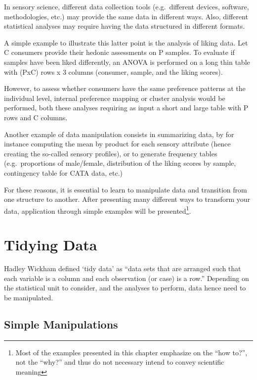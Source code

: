 \documentclass[
]{book}
\begin{document}
In sensory science, different data collection tools (e.g.~different devices, software, methodologies, etc.) may provide the same data in different ways. Also, different statistical analyses may require having the data structured in different formats.

A simple example to illustrate this latter point is the analysis of liking data.
Let C consumers provide their hedonic assessments on P samples. To evaluate if samples have been liked differently, an ANOVA is performed on a long thin table with (PxC) rows x 3 columns (consumer, sample, and the liking scores).

However, to assess whether consumers have the same preference patterns at the individual level, internal preference mapping or cluster analysis would be performed, both these analyses requiring as input a short and large table with P rows and C columns.

Another example of data manipulation consists in summarizing data, by for instance computing the mean by product for each sensory attribute (hence creating the so-called sensory profiles), or to generate frequency tables (e.g.~proportions of male/female, distribution of the liking scores by sample, contingency table for CATA data, etc.)

For these reasons, it is essential to learn to manipulate data and transition from one structure to another. After presenting many different ways to transform your data, application through simple examples will be presented\footnote{Most of the examples presented in this chapter emphasize on the ``how to?'', not the ``why?'' and thus do not necessary intend to convey scientific meaning}.

\hypertarget{tidy-data}{%
\section{Tidying Data}\label{tidy-data}}

Hadley Wickham defined `tidy data' as ``data sets that are arranged such that each variable is a column and each observation (or case) is a row.'' Depending on the statistical unit to consider, and the analyses to perform, data hence need to be manipulated.

\hypertarget{simple-manipulations}{%
\subsection{Simple Manipulations}\label{simple-manipulations}}
\end{document}
